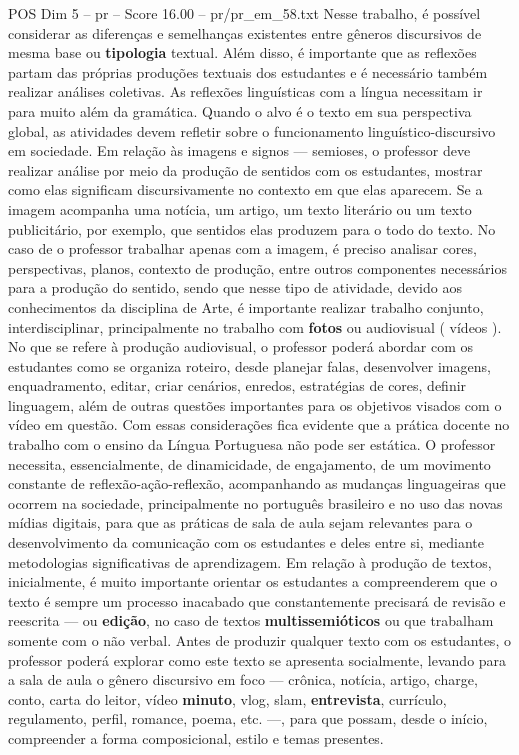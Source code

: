 \begin{textsample}{POS Dim 5 – pr – Score 16.00 – pr/pr\_em\_58.txt}
Nesse trabalho, é possível considerar as diferenças e semelhanças existentes entre gêneros discursivos de mesma base ou \textbf{tipologia} textual.
Além disso, é importante que as reflexões partam das próprias produções textuais dos estudantes e é necessário também realizar análises coletivas.
As reflexões linguísticas com a língua necessitam ir para muito além da gramática.
Quando o alvo é o texto em sua perspectiva global, as atividades devem refletir sobre o funcionamento linguístico-discursivo em sociedade.
Em relação às imagens e signos — semioses, o professor deve realizar análise por meio da produção de sentidos com os estudantes, mostrar como elas significam discursivamente no contexto em que elas aparecem.
Se a imagem acompanha uma notícia, um artigo, um texto literário ou um texto publicitário, por exemplo, que sentidos elas produzem para o todo do texto.
No caso de o professor trabalhar apenas com a imagem, é preciso analisar cores, perspectivas, planos, contexto de produção, entre outros componentes necessários para a produção do sentido, sendo que nesse tipo de atividade, devido aos conhecimentos da disciplina de Arte, é importante realizar trabalho conjunto, interdisciplinar, principalmente no trabalho com \textbf{fotos} ou audiovisual ( vídeos ).
No que se refere à produção audiovisual, o professor poderá abordar com os estudantes como se organiza roteiro, desde planejar falas, desenvolver imagens, enquadramento, editar, criar cenários, enredos, estratégias de cores, definir linguagem, além de outras questões importantes para os objetivos visados com o vídeo em questão.
Com essas considerações fica evidente que a prática docente no trabalho com o ensino da Língua Portuguesa não pode ser estática.
O professor necessita, essencialmente, de dinamicidade, de engajamento, de um movimento constante de reflexão-ação-reflexão, acompanhando as mudanças linguageiras que ocorrem na sociedade, principalmente no português brasileiro e no uso das novas mídias digitais, para que as práticas de sala de aula sejam relevantes para o desenvolvimento da comunicação com os estudantes e deles entre si, mediante metodologias significativas de aprendizagem.
Em relação à produção de textos, inicialmente, é muito importante orientar os estudantes a compreenderem que o texto é sempre um processo inacabado que constantemente precisará de revisão e reescrita — ou \textbf{edição}, no caso de textos \textbf{multissemióticos} ou que trabalham somente com o não verbal.
Antes de produzir qualquer texto com os estudantes, o professor poderá explorar como este texto se apresenta socialmente, levando para a sala de aula o gênero discursivo em foco — crônica, notícia, artigo, charge, conto, carta do leitor, vídeo \textbf{minuto}, vlog, slam, \textbf{entrevista}, currículo, regulamento, perfil, romance, poema, etc. —, para que possam, desde o início, compreender a forma composicional, estilo e temas presentes.

\end{textsample}
